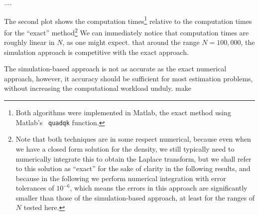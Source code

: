 ....





The second plot shows the computation times\footnote{Both algorithms
  were implemented in Matlab, the exact method using Matlab's {\tt
    quadqk} function. } relative to the computation times for the
``exact'' method\footnote{Note that both techniques are in some
  respect numerical, because even when we have a closed form solution
  for the density, we still typically need to numerically integrate
  this to obtain the Laplace transform, but we shall refer to this
  solution as ``exact'' for the sake of clarity in the following
  results, and because in the following we perform numerical
  integration with error tolerances of $10^{-6}$, which means the
  errors in this approach are significantly smaller than those of the
  simulation-based approach, at least for the ranges of $N$ tested
  here.}  We can immediately notice that computation times are roughly
linear in $N$, as one might expect. that around the range $N=100,000$,
the simulation approach is competitive with the exact approach.

The simulation-based approach is not as accurate as the exact
numerical approach, however, it accuracy should be sufficient for most
estimation problems, without increasing the computational workload
unduly.
make